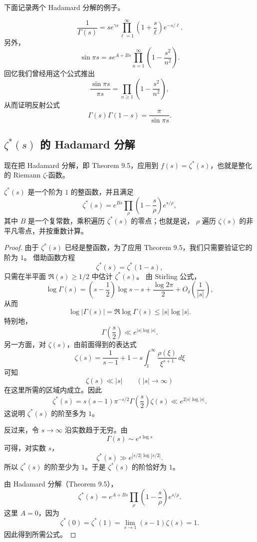 
下面记录两个 Hadamard 分解的例子。

\begin{example}
	\[
		\frac{1}{\Gamma(s)}
		=
		se^{\gamma s}
		\prod_{\ell=1}^{\infty}
		\left(1+\frac{s}{\ell}\right)e^{-s/\ell}.
	\]
	另外，
	\[
		\sin \pi s
		=
		se^{A+Bs}
		\prod_{n=1}^{\infty}\left(1-\frac{s^2}{n^2}\right).
	\]
	回忆我们曾经用这个公式推出
	\[
		\frac{\sin \pi s}{\pi s}
		=
		\prod_{n\geq 1}\left(1-\frac{s^2}{n^2}\right),
	\]
	从而证明反射公式
	\[
		\Gamma(s)\Gamma(1-s)=\frac{\pi}{\sin \pi s}.
	\]
\end{example}

\subsection{\texorpdfstring{\(\zeta^*(s)\) 的 Hadamard 分解}{zeta*(s) 的 Hadamard 分解}}

现在把 Hadamard 分解，即 Theorem 9.5，应用到
$f(s)=\zeta^*(s)$，也就是整化的 Riemann $\zeta$-函数。

\begin{theorem}
	$\zeta^*(s)$ 是一个阶为 $1$ 的整函数，并且满足
	\[
		\zeta^*(s)
			=
			e^{Bs}\prod_\rho
			\left(1-\frac{s}{\rho}\right)e^{s/\rho},
		\]
		其中 $B$ 是一个复常数，乘积遍历 $\zeta^*(s)$ 的零点；也就是说，
		$\rho$ 遍历 $\zeta(s)$ 的非平凡零点，并按重数计算。
\end{theorem}

\begin{proof}
	由于 $\zeta^*(s)$ 已经是整函数，为了应用 Theorem 9.5，我们只需要验证它的阶为 $1$。
	借助函数方程
	\[
		\zeta^*(s)=\zeta^*(1-s),
	\]
	只需在半平面 $\Re(s)\geq 1/2$ 中估计 $\zeta^*(s)$。
	由 Stirling 公式，
	\[
		\log\Gamma(s)
		=
		\left(s-\frac12\right)\log s-s+\frac{\log 2\pi}{2}
		+O_\delta\left(\frac1{|s|}\right),
	\]
	从而
	\[
		\log|\Gamma(s)|
		=
		\Re\log\Gamma(s)
		\leq |s|\log |s|.
	\]
	特别地，
	\[
		\Gamma\left(\frac{s}{2}\right)\ll e^{|s|\log |s|}.
	\]
	另一方面，对 $\zeta(s)$，由前面得到的表达式
	\[
		\zeta(s)
		=
		\frac{1}{s-1}
		+1
		-s\int_1^\infty \frac{\rho(\xi)}{\xi^{s+1}}\,d\xi
	\]
	可知
	\[
		\zeta(s)\ll |s|
		\qquad (|s|\to\infty)
	\]
	在这里所需的区域内成立。因此
	\[
		\zeta^*(s)
		=
		s(s-1)\pi^{-s/2}\Gamma\left(\frac{s}{2}\right)\zeta(s)
		\ll
		e^{2|s|\log |s|}.
	\]
	这说明 $\zeta^*(s)$ 的阶至多为 $1$。

	反过来，令 $s\to\infty$ 沿实数趋于无穷。由
	\[
		\Gamma(s)\sim e^{s\log s}
	\]
	可得，对实数 $s$，
	\[
		\zeta^*(s)\gg e^{|s/2|\log |s/2|}.
	\]
	所以 $\zeta^*(s)$ 的阶至少为 $1$。于是 $\zeta^*(s)$ 的阶恰好为 $1$。

	由 Hadamard 分解（Theorem 9.5），
	\[
		\zeta^*(s)
		=
		e^{A+Bs}\prod_\rho
		\left(1-\frac{s}{\rho}\right)e^{s/\rho}.
	\]
	这里 $A=0$，因为
	\[
		\zeta^*(0)=\zeta^*(1)
		=
		\lim_{s\to1}(s-1)\zeta(s)
		=
		1.
	\]
	因此得到所需公式。
\end{proof}

